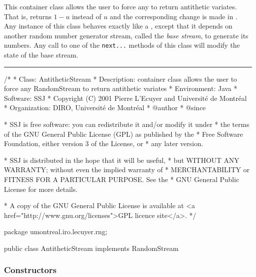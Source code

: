 
This container class allows the user to force any  to 
return antithetic variates.  That is,  returns 
$1-u$ instead of $u$ and the corresponding change is made in 
.
Any instance of this class behaves exactly like a ,
except that it depends on another random number generator stream, called the
\emph{base stream}, to generate its numbers. 
Any call to one of the \texttt{next...}
methods of this class will modify the state of the base stream. 


\bigskip\hrule

\begin{code}
\begin{hide}
/*
 * Class:        AntitheticStream
 * Description:  container class allows the user to force any RandomStream
                 to return antithetic variates
 * Environment:  Java
 * Software:     SSJ 
 * Copyright (C) 2001  Pierre L'Ecuyer and Université de Montréal
 * Organization: DIRO, Université de Montréal
 * @author       
 * @since

 * SSJ is free software: you can redistribute it and/or modify it under
 * the terms of the GNU General Public License (GPL) as published by the
 * Free Software Foundation, either version 3 of the License, or
 * any later version.

 * SSJ is distributed in the hope that it will be useful,
 * but WITHOUT ANY WARRANTY; without even the implied warranty of
 * MERCHANTABILITY or FITNESS FOR A PARTICULAR PURPOSE.  See the
 * GNU General Public License for more details.

 * A copy of the GNU General Public License is available at
   <a href="http://www.gnu.org/licenses">GPL licence site</a>.
 */
\end{hide}
package umontreal.iro.lecuyer.rng; 

public class AntitheticStream implements RandomStream \begin{hide} {

   // The base stream.
   private RandomStream st;

\end{hide}
\end{code}

\subsubsection* {Constructors}

